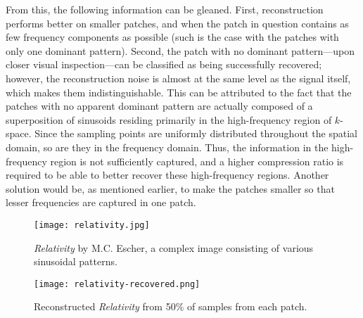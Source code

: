 From this, the following information can be gleaned. First, reconstruction performs better on smaller patches, and when the patch in question contains as few frequency components as possible (such is the case with the patches with only one dominant pattern). Second, the patch with no dominant pattern---upon closer visual inspection---can be classified as being successfully recovered; however, the reconstruction noise is almost at the same level as the signal itself, which makes them indistinguishable. This can be attributed to the fact that the patches with no apparent dominant pattern are actually composed of a superposition of sinusoids residing primarily in the high-frequency region of $k$-space. Since the sampling points are uniformly distributed throughout the spatial domain, so are they in the frequency domain. Thus, the information in the high-frequency region is not sufficiently captured, and a higher compression ratio is required to be able to better recover these high-frequency regions. Another solution would be, as mentioned earlier, to make the patches smaller so that lesser frequencies are captured in one patch.

\begin{figure}[htb]
	\texttt{[image: relativity.jpg]}
	\caption{\textit{Relativity} by M.C. Escher, a complex image consisting of various sinusoidal patterns.}
	\label{fig:relativity}
\end{figure}

\begin{figure}[htb]
	\texttt{[image: relativity-recovered.png]}
	\caption{Reconstructed \textit{Relativity} from 50\% of samples from each patch.}
	\label{fig:relativity-recovered}
\end{figure}

